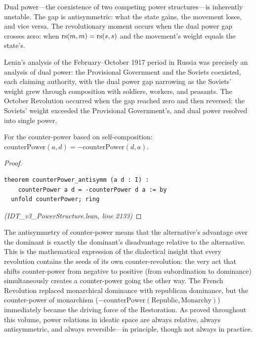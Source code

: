 \begin{interpretation}
Dual power---the coexistence of two competing power structures---is inherently
unstable. The gap is antisymmetric: what the state gains, the movement loses,
and vice versa. The revolutionary moment occurs when the dual power gap
crosses zero: when $\mathrm{rs}(m, m) = \mathrm{rs}(s, s)$ and the movement's weight equals
the state's.

Lenin's analysis of the February--October 1917 period in Russia was precisely
an analysis of dual power: the Provisional Government and the Soviets
coexisted, each claiming authority, with the dual power gap narrowing as the
Soviets' weight grew through composition with soldiers, workers, and peasants.
The October Revolution occurred when the gap reached zero and then reversed:
the Soviets' weight exceeded the Provisional Government's, and dual power
resolved into single power.
\end{interpretation}

\begin{theorem}
\label{thm:counter-power-antisymm}
For the counter-power based on self-composition:
$\mathrm{counterPower}(a, d) = -\mathrm{counterPower}(d, a)$.
\end{theorem}

\begin{proof}
\begin{lstlisting}
theorem counterPower_antisymm (a d : I) :
    counterPower a d = -counterPower d a := by
  unfold counterPower; ring
\end{lstlisting}
\textit{(IDT\_v3\_PowerStructure.lean, line 2133)}
\end{proof}

\begin{interpretation}
The antisymmetry of counter-power means that the alternative's advantage
over the dominant is exactly the dominant's disadvantage relative to the
alternative. This is the mathematical expression of the dialectical insight
that every revolution contains the seeds of its own counter-revolution:
the very act that shifts counter-power from negative to positive (from
subordination to dominance) simultaneously creates a counter-power going
the other way. The French Revolution replaced monarchical dominance with
republican dominance, but the counter-power of monarchism ($-\mathrm{counterPower}(
\text{Republic}, \text{Monarchy})$) immediately became the driving force of
the Restoration. As proved throughout this volume, power relations in
ideatic space are always relative, always antisymmetric, and always
reversible---in principle, though not always in practice.
\end{interpretation}
